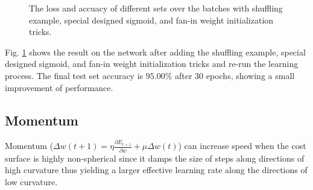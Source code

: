 \documentclass{article} %
\begin{document}
\begin{figure} [!htbp]
	
	\caption{The loss and accuacy of different sets over the batches with shuffling example, special designed sigmoid, and fan-in weight initialization tricks. }  
	\label{fig:P4}
\end{figure}

Fig. \ref{fig:P4} shows the result on the network after adding the shuffling example, special designed sigmoid, and fan-in weight initialization tricks and re-run the learning process. The final test set accuracy is $95.00\%$ after 30 epochs, showing a small improvement of performance.

\subsection{Momentum}
Momentum ($\Delta w(t+1) = \eta\frac{\partial E_{t+1}}{\partial w} + \mu \Delta w(t)$) can increase speed when the cost surface is highly non-spherical since it damps the size of steps along directions of high curvature thus yielding a larger effective learning rate along the directions of low curvature. 
\end{document}
